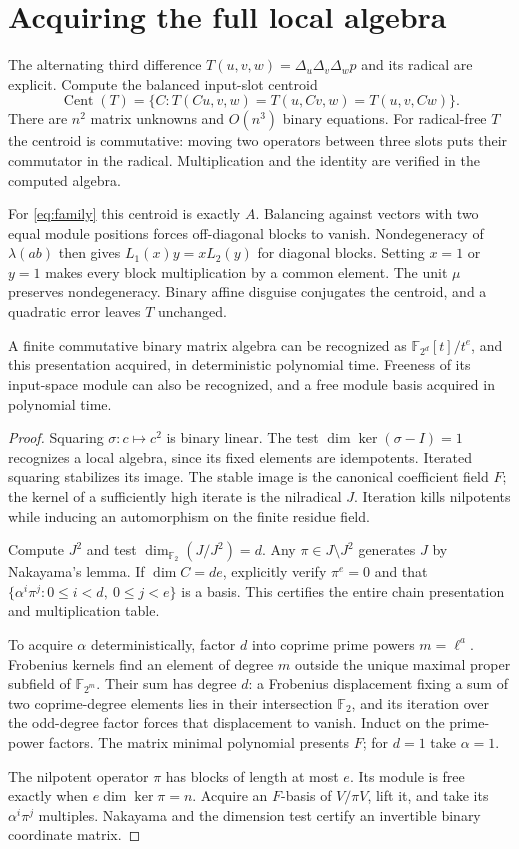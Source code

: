 \documentclass[11pt]{article}
\theoremstyle{remark}\newtheorem{remark}[theorem]{Remark}
\newcommand{\F}{\mathbb F}\newcommand{\Tr}{\operatorname{Tr}}
\newcommand{\Cent}{\operatorname{Cent}}\newcommand{\poly}{\operatorname{poly}}
\begin{document}
\section{Acquiring the full local algebra}
The alternating third difference $T(u,v,w)=\Delta_u\Delta_v\Delta_w p$
and its radical are explicit. Compute the balanced input-slot centroid
\[
 \Cent(T)=\{C:T(Cu,v,w)=T(u,Cv,w)=T(u,v,Cw)\}.
\]
There are $n^2$ matrix unknowns and $O(n^3)$ binary equations.
For radical-free $T$ the centroid is commutative: moving two operators
between three slots puts their commutator in the radical. Multiplication
and the identity are verified in the computed algebra.

For \eqref{eq:family} this centroid is exactly $A$. Balancing against vectors
with two equal module positions forces off-diagonal blocks to vanish.
Nondegeneracy of $\lambda(ab)$ then gives $L_1(x)y=xL_2(y)$ for diagonal
blocks. Setting $x=1$ or $y=1$ makes every block multiplication by a common
element. The unit $\mu$ preserves nondegeneracy. Binary affine disguise
conjugates the centroid, and a quadratic error leaves $T$ unchanged.

\begin{lemma}
A finite commutative binary matrix algebra can be recognized as
$\F_{2^d}[t]/t^e$, and this presentation acquired, in deterministic
polynomial time. Freeness of its input-space module can also be recognized,
and a free module basis acquired in polynomial time.
\end{lemma}
\begin{proof}
Squaring $\sigma:c\mapsto c^2$ is binary linear. The test
$\dim\ker(\sigma-I)=1$ recognizes a local algebra, since its fixed elements
are idempotents. Iterated squaring stabilizes its image. The stable image
is the canonical coefficient field $F$; the kernel of a sufficiently high
iterate is the nilradical $J$. Iteration kills nilpotents while inducing
an automorphism on the finite residue field.

Compute $J^2$ and test $\dim_{\F_2}(J/J^2)=d$. Any
$\pi\in J\setminus J^2$ generates $J$ by Nakayama's lemma.
If $\dim C=de$, explicitly verify $\pi^e=0$ and that
$\{\alpha^i\pi^j:0\le i<d,\ 0\le j<e\}$ is a basis. This certifies
the entire chain presentation and multiplication table.

To acquire $\alpha$ deterministically, factor $d$ into coprime prime
powers $m=\ell^a$. Frobenius kernels find an element of degree $m$
outside the unique maximal proper subfield of $\F_{2^m}$. Their sum
has degree $d$: a Frobenius displacement fixing a sum of two coprime-degree
elements lies in their intersection $\F_2$, and its iteration over the
odd-degree factor forces that displacement to vanish. Induct on the
prime-power factors. The matrix minimal polynomial presents $F$; for
$d=1$ take $\alpha=1$.

The nilpotent operator $\pi$ has blocks of length at most $e$.
Its module is free exactly when $e\dim\ker\pi=n$.
Acquire an $F$-basis of $V/\pi V$, lift it, and take its
$\alpha^i\pi^j$ multiples. Nakayama and the dimension test certify an
invertible binary coordinate matrix.
\end{proof}
\end{document}
